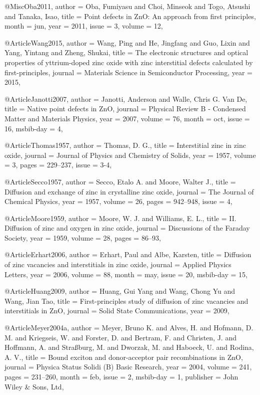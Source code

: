 @Misc{Oba2011,
  author = {Oba, Fumiyasu and Choi, Minseok and Togo, Atsushi and Tanaka, Isao},
  title  = {Point defects in ZnO: An approach from first principles},
  month  = jun,
  year   = {2011},
  issue  = {3},
  volume = {12},
}

@Article{Wang2015,
  author  = {Wang, Ping and He, Jingfang and Guo, Lixin and Yang, Yintang and Zheng, Shukai},
  title   = {The electronic structures and optical properties of yttrium-doped zinc oxide with zinc interstitial defects calculated by first-principles},
  journal = {Materials Science in Semiconductor Processing},
  year    = {2015},
}

@Article{Janotti2007,
  author    = {Janotti, Anderson and Walle, Chris G. Van De},
  title     = {Native point defects in ZnO},
  journal   = {Physical Review B - Condensed Matter and Materials Physics},
  year      = {2007},
  volume    = {76},
  month     = oct,
  issue     = {16},
  msbib-day = {4},
}

@Article{Thomas1957,
  author  = {Thomas, D. G.},
  title   = {Interstitial zinc in zinc oxide},
  journal = {Journal of Physics and Chemistry of Solids},
  year    = {1957},
  volume  = {3},
  pages   = {229--237},
  issue   = {3-4},
}

@Article{Secco1957,
  author  = {Secco, Etalo A. and Moore, Walter J.},
  title   = {Diffusion and exchange of zinc in crystalline zinc oxide},
  journal = {The Journal of Chemical Physics},
  year    = {1957},
  volume  = {26},
  pages   = {942--948},
  issue   = {4},
}

@Article{Moore1959,
  author  = {Moore, W. J. and Williams, E. L.},
  title   = {II. Diffusion of zinc and oxygen in zinc oxide},
  journal = {Discussions of the Faraday Society},
  year    = {1959},
  volume  = {28},
  pages   = {86--93},
}

@Article{Erhart2006,
  author    = {Erhart, Paul and Albe, Karsten},
  title     = {Diffusion of zinc vacancies and interstitials in zinc oxide},
  journal   = {Applied Physics Letters},
  year      = {2006},
  volume    = {88},
  month     = may,
  issue     = {20},
  msbib-day = {15},
}

@Article{Huang2009,
  author  = {Huang, Gui Yang and Wang, Chong Yu and Wang, Jian Tao},
  title   = {First-principles study of diffusion of zinc vacancies and interstitials in ZnO},
  journal = {Solid State Communications},
  year    = {2009},
}

@Article{Meyer2004a,
  author    = {Meyer, Bruno K. and Alves, H. and Hofmann, D. M. and Kriegseis, W. and Forster, D. and Bertram, F. and Christen, J. and Hoffmann, A. and Straßburg, M. and Dworzak, M. and Haboeck, U. and Rodina, A. V.},
  title     = {Bound exciton and donor-acceptor pair recombinations in ZnO},
  journal   = {Physica Status Solidi (B) Basic Research},
  year      = {2004},
  volume    = {241},
  pages     = {231--260},
  month     = feb,
  issue     = {2},
  msbib-day = {1},
  publisher = {John Wiley \& Sons, Ltd},
}

